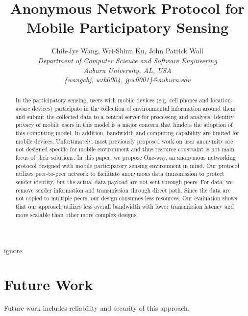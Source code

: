 \documentclass[10pt,conference,letterpaper]{IEEEtran}
\title{Anonymous Network Protocol for Mobile Participatory Sensing}
\author{
Chih-Jye Wang, Wei-Shinn Ku, John Patrick Wall
\vspace{1.6mm}\\
\fontsize{10}{10}\selectfont\itshape
Department of Computer Science and Software Engineering\\
Auburn University, AL, USA\\
\fontsize{9}{9}\selectfont\ttfamily\upshape
\{wangchj, wzk0004, jpw0001\}@auburn.edu\\
}
\begin{document}
\maketitle

\begin{abstract}
In the participatory sensing, users with mobile devices (e.g. cell phones
and location-aware devices) participate in the collection of environmental
information around them and submit the collected data to a central server
for processing and analysis. Identity privacy of mobile users in this model
is a major concern that hinders the adoption of this computing model. In
addition, bandwidth and computing capability are limited for mobile devices.
Unfortunately, most previously proposed work on user anonymity are not
designed specific for mobile environment and thus resource constraint is
not main focus of their solutions.
In this paper, we propose One-way, an anonymous networking protocol designed
with mobile participatory sensing environment in mind. Our protocol utilizes
peer-to-peer network to facilitate anonymous data transmission to protect
sender identity, but the actual data payload are not sent through peers. For
data, we remove sender information and transmission through direct path.
Since the data are not copied to multiple peers, our design consumes less
resources. Our evaluation shows that our approach utilizes less overall
bandwidth with lower transmission latency and more scalable than other
more complex designs.
\end{abstract}

\begin{keywords}
ignore
\end{keywords}
%







%

\section{Future Work}
Future work includes reliability and security of this approach.


%
\end{document}

